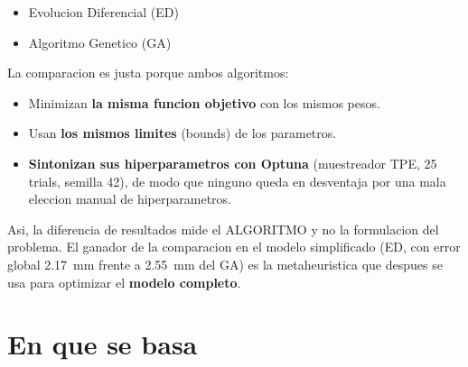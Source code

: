 \documentclass[11pt,a4paper]{article}
\begin{document}
\begin{itemize}[leftmargin=1.4em]
  \item Evolucion Diferencial (ED)
  \item Algoritmo Genetico (GA)
\end{itemize}

La comparacion es justa porque ambos algoritmos:

\begin{itemize}[leftmargin=1.4em]
  \item Minimizan \textbf{la misma funcion objetivo} con los mismos pesos.
  \item Usan \textbf{los mismos limites} (bounds) de los parametros.
  \item \textbf{Sintonizan sus hiperparametros con Optuna} (muestreador TPE, 25
        trials, semilla 42), de modo que ninguno queda en desventaja por una mala
        eleccion manual de hiperparametros.
\end{itemize}

Asi, la diferencia de resultados mide el ALGORITMO y no la formulacion del
problema. El ganador de la comparacion en el modelo simplificado (ED, con error
global 2.17~mm frente a 2.55~mm del GA) es la metaheuristica que despues se usa
para optimizar el \textbf{modelo completo}.

\section{En que se basa}
\end{document}
